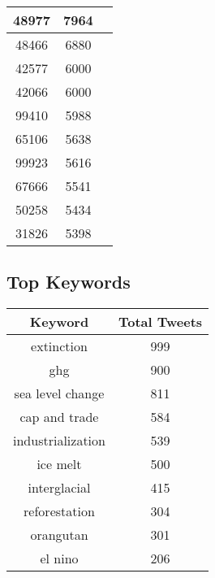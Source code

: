 \documentclass{article}\usepackage[T1]{fontenc}
\begin{document}
\begin{tabular}{|c|c|c|}
 \hline
48977 & 7964\\ 
 \hline
48466 & 6880\\ 
 \hline
42577 & 6000\\ 
 \hline
42066 & 6000\\ 
 \hline
99410 & 5988\\ 
 \hline
65106 & 5638\\ 
 \hline
99923 & 5616\\ 
 \hline
67666 & 5541\\ 
 \hline
50258 & 5434\\ 
 \hline
31826 & 5398\\ 
 \hline
\end{tabular}\subsection*{Top Keywords}\begin{tabular}{|c|c|}         \hline         Keyword & Total Tweets \\ 
 \hline
extinction & 999\\ 
 \hline
ghg & 900\\ 
 \hline
sea level change & 811\\ 
 \hline
cap and trade & 584\\ 
 \hline
industrialization & 539\\ 
 \hline
ice melt & 500\\ 
 \hline
interglacial & 415\\ 
 \hline
reforestation & 304\\ 
 \hline
orangutan & 301\\ 
 \hline
el nino & 206\\ 
 \hline
\end{tabular}
\end{document}
